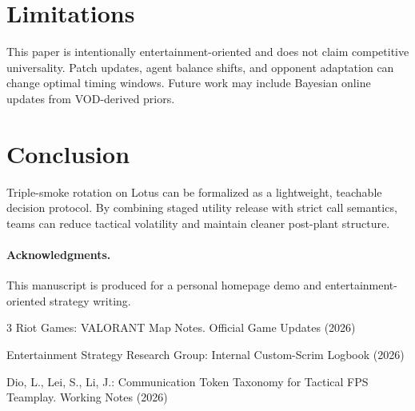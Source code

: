\documentclass[runningheads]{llncs}
\begin{document}
\section{Limitations}
This paper is intentionally entertainment-oriented and does not claim competitive universality. Patch updates, agent balance shifts, and opponent adaptation can change optimal timing windows. Future work may include Bayesian online updates from VOD-derived priors.

\section{Conclusion}
Triple-smoke rotation on Lotus can be formalized as a lightweight, teachable decision protocol. By combining staged utility release with strict call semantics, teams can reduce tactical volatility and maintain cleaner post-plant structure.

\paragraph{Acknowledgments.}
This manuscript is produced for a personal homepage demo and entertainment-oriented strategy writing.

\begin{thebibliography}{3}
Riot Games: VALORANT Map Notes. Official Game Updates (2026)

Entertainment Strategy Research Group: Internal Custom-Scrim Logbook (2026)

Dio, L., Lei, S., Li, J.: Communication Token Taxonomy for Tactical FPS Teamplay. Working Notes (2026)
\end{thebibliography}
\end{document}

